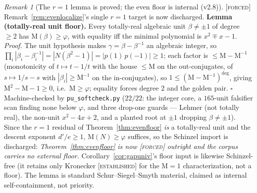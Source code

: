 \documentclass[11pt]{article}
\newcommand{\tagF}{\textcolor{cF}{\textsc{[forced]}}}
\newcommand{\tagE}{\textcolor{cE}{\textsc{[established]}}}
\newcommand{\gp}{\varphi}
\newcommand{\M}{\mathrm{M}}
\theoremstyle{plain}
\theoremstyle{definition}
\theoremstyle{remark}
\newtheorem{remark}[theorem]{Remark}
\begin{document}
\begin{remark}[The $r=1$ lemma is proved; the even floor is internal (v2.8)]\label{rem:evenv28}\tagF{}
Remark~\ref{rem:evenlocalize}'s single $r=1$ target is now discharged.
\textbf{Lemma (totally-real unit floor).} Every totally-real algebraic unit
$\beta\ne\pm1$ of degree $\ge2$ has $\M(\beta)\ge\gp$, with equality iff the minimal
polynomial is $x^2\mp x-1$. \emph{Proof.} The unit hypothesis makes
$\gamma=\beta-\beta^{-1}$ an algebraic integer, so
$\prod_i|\beta_i-\beta_i^{-1}|=|N(\beta^2-1)|=|p(1)\,p(-1)|\ge1$; each factor is
$\le\M-\M^{-1}$ (monotonicity of $t\mapsto t-1/t$ with the house $\le\M$ on the
out-conjugates, of $s\mapsto1/s-s$ with $|\beta_i|\ge\M^{-1}$ on the in-conjugates),
so $1\le(\M-\M^{-1})^{\deg}$, giving $\M^2-\M-1\ge0$, i.e.\ $\M\ge\gp$; equality
forces degree $2$ and the golden pair. $\square$ Machine-checked by
\texttt{pu\_softcheck.py} ($22/22$: the integer core, a $165$-unit falsifier scan
finding none below $\gp$, and three drop-one guards --- Lehmer (not totally real),
the non-unit $x^2-4x+2$, and a planted root at $\pm1$ dropping $\beta\ne\pm1$). Since the $r=1$ residual of Theorem~\ref{thm:evenfloor}
\emph{is} a totally-real unit and the descent exponent $d'/e\ge1$, $\M(N)\ge\gp$
suffices, so the Schinzel import is discharged: \emph{Theorem~\ref{thm:evenfloor} is
now \tagF{} outright and the corpus carries \emph{no} external floor.}
Corollary~\ref{cor:gapuniv}'s floor input is likewise Schinzel-free (it retains only
Kronecker \tagE{} for the $\M=1$ characterization, not a floor). The lemma is
standard Schur--Siegel--Smyth material, claimed as internal self-containment, not
priority.
\end{remark}
\end{document}
